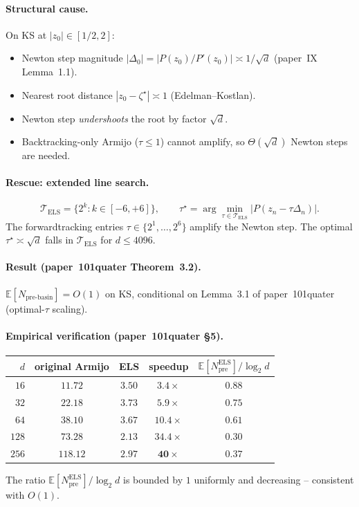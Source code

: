 \documentclass[11pt,a4paper]{article}
\begin{document}
\paragraph{Structural cause.} On KS at $|z_0| \in [1/2, 2]$:
\begin{itemize}
\item Newton step magnitude $|\Delta_0| = |P(z_0)/P'(z_0)| \asymp 1/\sqrt d$ (paper~IX Lemma~1.1).
\item Nearest root distance $|z_0 - \zeta^\star| \asymp 1$ (Edelman--Kostlan).
\item Newton step \emph{undershoots} the root by factor $\sqrt d$.
\item Backtracking-only Armijo ($\tau \le 1$) cannot amplify, so $\Theta(\sqrt d)$ Newton steps are needed.
\end{itemize}

\paragraph{Rescue: extended line search.}
$$
\mathcal{T}_{\text{ELS}} = \{2^k : k \in [-6, +6]\}, \qquad \tau^\star = \arg\min_{\tau \in \mathcal{T}_{\text{ELS}}} |P(z_n - \tau \Delta_n)|.
$$
The forwardtracking entries $\tau \in \{2^1, \dots, 2^6\}$ amplify the Newton step. The optimal $\tau^\star \asymp \sqrt d$ falls in $\mathcal{T}_{\text{ELS}}$ for $d \le 4096$.

\paragraph{Result (paper~101quater Theorem~3.2).}
$\mathbb{E}[N_{\text{pre-basin}}] = O(1)$ on KS, conditional on Lemma~3.1 of paper~101quater (optimal-$\tau$ scaling).

\paragraph{Empirical verification (paper~101quater \S5).}
\begin{center}
\begin{tabular}{rcccc}
\toprule
$d$ & original Armijo & ELS & speedup & $\mathbb{E}[N_{\text{pre}}^{\text{ELS}}] / \log_2 d$ \\
\midrule
$16$  & $11.72$  & $3.50$ & $3.4\times$  & $0.88$ \\
$32$  & $22.18$  & $3.73$ & $5.9\times$  & $0.75$ \\
$64$  & $38.10$  & $3.67$ & $10.4\times$ & $0.61$ \\
$128$ & $73.28$  & $2.13$ & $34.4\times$ & $0.30$ \\
$256$ & $118.12$ & $2.97$ & $\mathbf{40\times}$ & $0.37$ \\
\bottomrule
\end{tabular}
\end{center}
The ratio $\mathbb{E}[N_{\text{pre}}^{\text{ELS}}]/\log_2 d$ is bounded by $1$ uniformly and decreasing -- consistent with $O(1)$.
\end{document}
